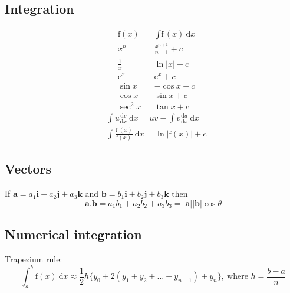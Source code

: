 \documentclass[../"Formula sheet.tex"]{subfiles}
\begin{document}
\subsection{Integration}
\begin{align}
    &\mathrm{f}(x)  &  &\text{\(\int\)f}(x) \ \mathrm{d}x \nonumber \\
    &x^n            &  &\frac{x^{n+1}}{n+1} + c \\
    &\frac{1}{x}    &  &\ln|x| + c \\
    &\mathrm{e}^x   &  &\mathrm{e}^x + c \\
    &\sin{x}        &  &-\cos{x} + c \\
    &\cos{x}        &  &\sin{x} + c \\
    &\sec^2 x       &  &\tan{x} + c
\end{align}
\begin{align}
    &\int u \frac{\mathrm{d}v}{\mathrm{d}x} \ \mathrm{d}x = uv - \int v \frac{\mathrm{d}u}{\mathrm{d}x} \ \mathrm{d}x \\
    &\int \frac{\mathrm{f}'(x)}{\mathrm{f}(x)} \ \mathrm{d}x = \ln{|\mathrm{f}(x)|} + c
\end{align}

\subsection{Vectors}
\quad \enspace{}If \(\mathbf{a} = a_1\mathbf{i} + a_2\mathbf{j} + a_3\mathbf{k}\) and \(\mathbf{b} = b_1\mathbf{i} + b_2\mathbf{j} + b_3\mathbf{k}\) then
\begin{equation}
    \mathbf{a.b} = a_1 b_1 + a_2 b_2 + a_3 b_3 = |\mathbf{a}| |\mathbf{b}| \cos \theta
\end{equation}

\subsection{Numerical integration}
\quad \enspace{}Trapezium rule:
\begin{equation}
    \int_a^{b} \mathrm{f}(x) \ \mathrm{d}x \approx \frac{1}{2}h\{y_0 + 2(y_1 + y_2 + \dots + y_{n-1}) + y_n\}, \ \text{where \(h = \frac{b-a}{n}\)}
\end{equation}
\end{document}
